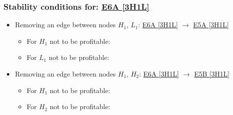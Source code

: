 

\subsubsection{Stability conditions for: \hyperref[apx:E6A:3H1L]{E6A [3H1L]}}
\label{apx:E6A:3H1L_stability_cond}

\begin{itemize}

	\item Removing an edge between nodes $H_1$, $L_1$: \hyperref[apx:E6A:3H1L]{E6A [3H1L]} $\to$ \hyperref[apx:E5A:3H1L]{E5A [3H1L]}

	\begin{itemize}

		\item For $H_1$ not to be profitable:


		\item For $L_1$ not to be profitable:


	\end{itemize}

	\item Removing an edge between nodes $H_1$, $H_2$: \hyperref[apx:E6A:3H1L]{E6A [3H1L]} $\to$ \hyperref[apx:E5B:3H1L]{E5B [3H1L]}

	\begin{itemize}

		\item For $H_1$ not to be profitable:


		\item For $H_2$ not to be profitable:


	\end{itemize}

\end{itemize}



